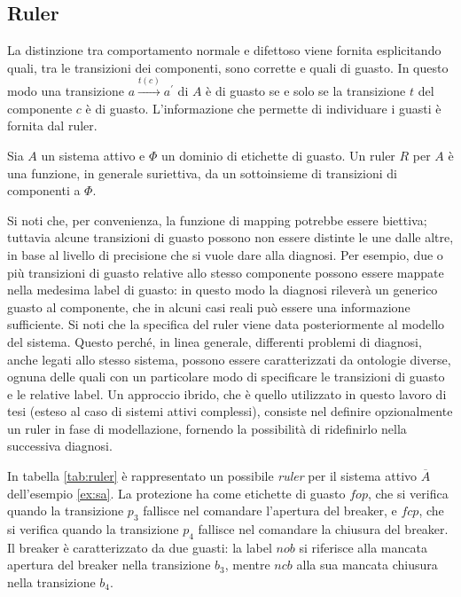 \subsection{Ruler}
La distinzione tra comportamento normale e difettoso viene fornita esplicitando quali, tra le transizioni dei componenti, sono corrette e quali di guasto. In questo modo una transizione $a \xrightarrow{t(c)} a^\prime$ di $A$ è di guasto se e solo se la transizione $t$ del componente $c$ è di guasto.
L'informazione che permette di individuare i guasti è fornita dal ruler.
\begin{defn}
Sia $A$ un sistema attivo e $\Phi$ un dominio di etichette di guasto. Un ruler $R$ per $A$ è una funzione, in generale suriettiva, da un sottoinsieme di transizioni di componenti a $\Phi$.
\end{defn}
Si noti che, per convenienza, la funzione di mapping potrebbe essere biettiva; tuttavia alcune transizioni di guasto possono non essere distinte le une dalle altre, in base al livello di precisione che si vuole dare alla diagnosi. Per esempio, due o più transizioni di guasto relative allo stesso componente possono essere mappate nella medesima label di guasto: in questo modo la diagnosi rileverà un generico guasto al componente, che in alcuni casi reali può essere una informazione sufficiente.
Si noti che la specifica del ruler viene data posteriormente al modello del sistema. Questo perché, in linea generale, differenti problemi di diagnosi, anche legati allo stesso sistema, possono essere caratterizzati da ontologie diverse, ognuna delle quali con un particolare modo di specificare le transizioni di guasto e le relative label. Un approccio ibrido, che è quello utilizzato in questo lavoro di tesi (esteso al caso di sistemi attivi complessi), consiste nel definire opzionalmente un ruler in fase di modellazione, fornendo la possibilità di ridefinirlo nella successiva diagnosi.

\begin{ex}
In tabella \ref{tab:ruler} è rappresentato un possibile \emph{ruler} per il sistema attivo $\overline{A}$ dell'esempio \ref{ex:sa}. La protezione ha come etichette di guasto $fop$, che si verifica quando la transizione $p_3$ fallisce nel comandare l'apertura del breaker, e $fcp$, che si verifica quando la transizione $p_4$ fallisce nel comandare la chiusura del breaker. 
Il breaker è caratterizzato da due guasti: la label $nob$ si riferisce alla mancata apertura del breaker nella transizione $b_3$, mentre $ncb$ alla sua mancata chiusura nella transizione $b_4$.
\end{ex}


